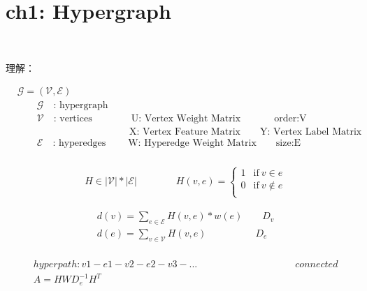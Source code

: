 \documentclass{article}
\begin{document}
\section*{ch1: Hypergraph}


~ \\[3pt]
\begin{CJK}{UTF8}{gbsn}
    理解： \\[3pt]
\end{CJK}


%
\begin{align*}
    & \mathcal{G} = ( \mathcal{V} , \mathcal{E} )  \\[3pt]
        & \qquad \mathcal{G} \quad \text{: hypergraph}  \\[3pt]
        & \qquad \mathcal{V} \quad \text{: vertices} 
          \qquad \qquad \text{U: Vertex Weight Matrix} 
          \qquad \quad \ \ \text{order:V}  \\[3pt]
        & \qquad \qquad \qquad \qquad \qquad \quad \ \ \text{X: Vertex Feature Matrix} 
          \qquad \text{Y: Vertex Label Matrix}  \\[3pt]
        & \qquad \mathcal{E} \quad \text{: hyperedges} 
          \qquad \; \text{W: Hyperedge Weight Matrix} 
          \qquad \text{size:E}  \\[3pt]
\end{align*}

%
\begin{align*}
    & H \in { |\mathcal{V}| * |\mathcal{E}| } \qquad \qquad 
    H(v, e) = \left\{ 
        \begin{array}{cc}
            1       & \text{if} \ v \in e    \\[3pt]
            0       & \text{if} \ v \notin e \\[3pt]
        \end{array} \right. 
\end{align*}

%
\begin{align*}
    & d(v) = \sum_{e \in \mathcal{E}} H(v, e)*w(e) \qquad D_{v} \\[3pt]
    & d(e) = \sum_{v \in \mathcal{V}} H(v, e)      \qquad \qquad \quad D_{e} \\[3pt]
\end{align*}

%
\begin{align*}
    & hyperpath: v1-e1-v2-e2-v3-... \qquad \qquad \qquad \qquad \qquad connected  \\[3pt]
    & A = H W D^{-1}_{e} H^{T}  \\[3pt]
\end{align*}
\end{document}
